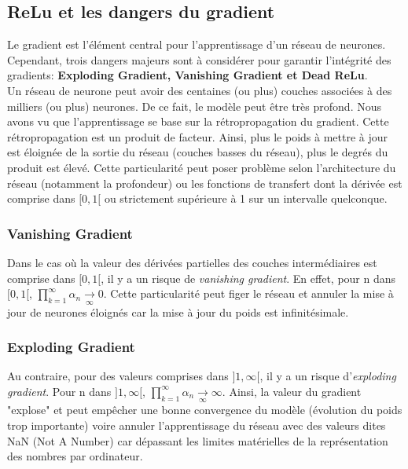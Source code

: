 \subsection{ReLu et les dangers du gradient}
\label{relu_danger}
Le gradient est l'élément central pour l'apprentissage d'un réseau de neurones. Cependant, trois dangers majeurs sont à considérer pour garantir l'intégrité des gradients: \textbf{Exploding Gradient, Vanishing Gradient et Dead ReLu}.\\

\noindent Un réseau de neurone peut avoir des centaines (ou plus) couches associées à des milliers (ou plus) neurones. De ce fait, le modèle peut être très profond. Nous avons vu que l'apprentissage se base sur la rétropropagation du gradient. Cette rétropropagation est un produit de facteur. Ainsi, plus le poids à mettre à jour est éloignée de la sortie du réseau (couches basses du réseau), plus le degrés du produit est élevé. Cette particularité peut poser problème selon l'architecture du réseau (notamment la profondeur) ou les fonctions de transfert dont la dérivée est comprise dans $[0,1[$ ou strictement supérieure à 1 sur un intervalle quelconque.

\subsubsection{Vanishing Gradient}
\noindent Dans le cas où la valeur des dérivées partielles des couches intermédiaires est comprise dans $[0,1[$, il y a un risque de \textit{vanishing gradient}. En effet, pour n dans $[0,1[$, $\prod_{k=1}^\infty \alpha_n \underset{\infty}{\longrightarrow} 0$. Cette particularité peut figer le réseau et annuler la mise à jour de neurones éloignés car la mise à jour du poids est infinitésimale.

\subsubsection{Exploding Gradient}
\label{explodsec}
\noindent Au contraire, pour des valeurs comprises dans $]1,\infty[$, il y a un risque d'\textit{exploding gradient}. Pour n dans $]1,\infty[$, $\prod_{k=1}^\infty \alpha_n \underset{\infty}{\longrightarrow} \infty$. Ainsi, la valeur du gradient "explose" et peut empêcher une bonne convergence du modèle (évolution du poids trop importante) voire annuler l'apprentissage du réseau avec des valeurs dites NaN (Not A Number) car dépassant les limites matérielles de la représentation des nombres par ordinateur.

